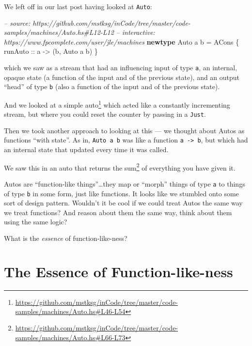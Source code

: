 \documentclass[]{article}
\newenvironment{Shaded}{}{}
\newcommand{\CommentTok}[1]{\textcolor[rgb]{0.38,0.63,0.69}{\textit{#1}}}
\newcommand{\DataTypeTok}[1]{\textcolor[rgb]{0.56,0.13,0.00}{#1}}
\newcommand{\FunctionTok}[1]{\textcolor[rgb]{0.02,0.16,0.49}{#1}}
\newcommand{\KeywordTok}[1]{\textcolor[rgb]{0.00,0.44,0.13}{\textbf{#1}}}
\newcommand{\NormalTok}[1]{#1}
\newcommand{\OtherTok}[1]{\textcolor[rgb]{0.00,0.44,0.13}{#1}}
\renewcommand{\href}[2]{#2\footnote{\url{#1}}}
\begin{document}
We left off in our last post having looked at \texttt{Auto}:

\begin{Shaded}
\begin{Highlighting}[]
\CommentTok{-- source: https://github.com/mstksg/inCode/tree/master/code-samples/machines/Auto.hs#L12-L12}
\CommentTok{-- interactive: https://www.fpcomplete.com/user/jle/machines}
\KeywordTok{newtype} \DataTypeTok{Auto}\NormalTok{ a b }\FunctionTok{=} \DataTypeTok{ACons}\NormalTok{ \{}\OtherTok{ runAuto ::}\NormalTok{ a }\OtherTok{->}\NormalTok{ (b, }\DataTypeTok{Auto}\NormalTok{ a b) \}}
\end{Highlighting}
\end{Shaded}

which we saw as a stream that had an influencing input of type \texttt{a}, an
internal, opaque state (a function of the input and of the previous state), and
an output ``head'' of type \texttt{b} (also a function of the input and of the
previous state).

And we looked at
\href{https://github.com/mstksg/inCode/tree/master/code-samples/machines/Auto.hs\#L46-L54}{a
simple auto} which acted like a constantly incrementing stream, but where you
could reset the counter by passing in a \texttt{Just}.

Then we took another approach to looking at this --- we thought about Autos as
functions ``with state''. As in, \texttt{Auto\ a\ b} was like a function
\texttt{a\ -\textgreater{}\ b}, but which had an internal state that updated
every time it was called.

We saw this in an auto that
\href{https://github.com/mstksg/inCode/tree/master/code-samples/machines/Auto.hs\#L66-L73}{returns
the sum} of everything you have given it.

Autos are ``function-like things''\ldots{}they map or ``morph'' things of type
\texttt{a} to things of type \texttt{b} in some form, just like functions. It
looks like we stumbled onto some sort of design pattern. Wouldn't it be cool if
we could treat Autos the same way we treat functions? And reason about them the
same way, think about them using the same logic?

What is the \emph{essence} of function-like-ness?

\hypertarget{the-essence-of-function-like-ness}{%
\section{The Essence of
Function-like-ness}\label{the-essence-of-function-like-ness}}
\end{document}
